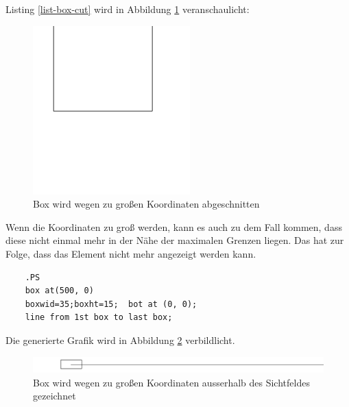 \begin{itemize}
	\noindent
	Listing \ref{list-box-cut} wird in Abbildung \ref{Box_Cut} veranschaulicht:
	\noindent
	\begin{figure}[H]
		\begin{center}
			\includegraphics[scale=0.5]{images/Erg_Code_abgeschnitten.png}
			\caption{Box wird wegen zu großen Koordinaten abgeschnitten}
			\label{Box_Cut}
		\end{center}
	\end{figure}
\pra
	Wenn die Koordinaten zu groß werden, kann es auch zu dem Fall kommen, dass diese nicht einmal mehr in der Nähe der maximalen Grenzen liegen. Das hat zur Folge, dass das Element nicht mehr angezeigt werden kann. 
	\\
	\lstset{frame=lines}
	\lstset{basicstyle=\footnotesize}
	\begin{lstlisting}
	.PS
	box at(500, 0)
	boxwid=35;boxht=15;  bot at (0, 0);
	line from 1st box to last box;
	\end{lstlisting}
	\noindent
	Die generierte Grafik wird in Abbildung \ref{Box_Away} verbildlicht. \pra
	\begin{figure}[h!]
		\begin{center}
			\includegraphics{images/ERG_Box_weg.png}
			\caption{Box wird wegen zu großen Koordinaten ausserhalb des Sichtfeldes gezeichnet}
			\label{Box_Away}
		\end{center}
	\end{figure}
	\\	
\end{itemize}
